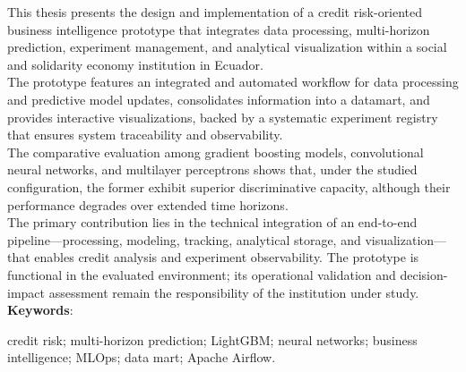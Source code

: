 This thesis presents the design and implementation of a credit risk-oriented business intelligence prototype that integrates data processing, multi-horizon prediction, experiment management, and analytical visualization within a social and solidarity economy institution in Ecuador.\\

The prototype features an integrated and automated workflow for data processing and predictive model updates, consolidates information into a datamart, and provides interactive visualizations, backed by a systematic experiment registry that ensures system traceability and observability.\\

The comparative evaluation among gradient boosting models, convolutional neural networks, and multilayer perceptrons shows that, under the studied configuration, the former exhibit superior discriminative capacity, although their performance degrades over extended time horizons.\\

The primary contribution lies in the technical integration of an end-to-end pipeline—processing, modeling, tracking, analytical storage, and visualization—that enables credit analysis and experiment observability. The prototype is functional in the evaluated environment; its operational validation and decision-impact assessment remain the responsibility of the institution under study.\\

\noindent\textbf{Keywords}:

credit risk; multi-horizon prediction; LightGBM; neural networks; business intelligence; MLOps; data mart; Apache Airflow.